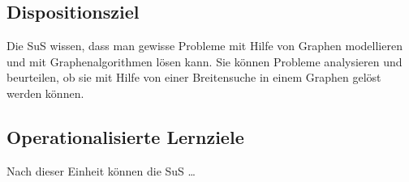 \subsection{Dispositionsziel}

Die SuS wissen, dass man gewisse Probleme mit Hilfe von Graphen modellieren und mit Graphenalgorithmen lösen kann. 
Sie können Probleme analysieren und beurteilen, ob sie mit Hilfe von einer Breitensuche in einem Graphen gelöst werden können.



\subsection{Operationalisierte Lernziele}

Nach dieser Einheit können die SuS \dots

